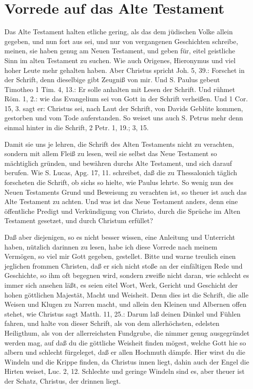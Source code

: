 
\chapter{Vorrede auf das Alte Testament}

Das Alte Testament halten etliche gering, als das dem jüdischen Volke allein gegeben, und nun fort aus sei, und nur von vergangenen Geschichten schreibe, meinen, sie haben genug am Neuen Testament, und geben für, eitel geistliche Sinn im alten Testament zu suchen. Wie auch Origenes, Hieronymus und viel hoher Leute mehr gehalten haben. Aber Christus spricht Joh. 5, 39.: Forschet in der Schrift, denn dieselbige gibt Zeugniß von mir. Und S. Paulus gebeut Timotheo 1 Tim. 4, 13.: Er solle anhalten mit Lesen der Schrift. Und rühmet Röm. 1, 2.: wie das Evangelium sei von Gott in der Schrift verheißen. Und 1 Cor. 15, 3. sagt er: Christus sei, nach Laut der Schrift, von Davids Geblüte kommen, gestorben und vom Tode auferstanden. So weiset uns auch S. Petrus mehr denn einmal hinter in die Schrift, 2 Petr. 1, 19.; 3, 15.

Damit sie uns je lehren, die Schrift des Alten Testaments nicht zu verachten, sondern mit allem Fleiß zu lesen, weil sie selbst das Neue Testament so mächtiglich gründen, und bewähren durchs Alte Testament, und sich darauf berufen. Wie S. Lucas, Apg. 17, 11. schreibet, daß die zu Thessalonich täglich forscheten die Schrift, ob sichs so hielte, wie Paulus lehrte. So wenig nun des Neuen Testaments Grund und Beweisung zu verachten ist, so theuer ist auch das Alte Testament zu achten. Und was ist das Neue Testament anders, denn eine öffentliche Predigt und Verkündigung von Christo, durch die Sprüche im Alten Testament gesetzet, und durch Christum erfüllet?

Daß aber diejenigen, so es nicht besser wissen, eine Anleitung und Unterricht haben, nützlich darinnen zu lesen, habe ich diese Vorrede nach meinem Vermögen, so viel mir Gott gegeben, gestellet. Bitte und warne treulich einen jeglichen frommen Christen, daß er sich nicht stoße an der einfältigen Rede und Geschichte, so ihm oft begegnen wird, sondern zweifle nicht daran, wie schlecht es immer sich ansehen läßt, es seien eitel Wort, Werk, Gericht und Geschicht der hohen göttlichen Majestät, Macht und Weisheit. Denn dies ist die Schrift, die alle Weisen und Klugen zu Narren macht, und allein den Kleinen und Albernen offen stehet, wie Christus sagt Matth. 11, 25.: Darum laß deinen Dünkel und Fühlen fahren, und halte von dieser Schrift, als von dem allerhöchsten, edelsten Heiligthum, als von der allerreichsten Fundgrube, die nimmer genug ausgegründet werden mag, auf daß du die göttliche Weisheit finden mögest, welche Gott hie so albern und schlecht fürgeleget, daß er allen Hochmuth dämpfe. Hier wirst du die Windeln und die Krippe finden, da Christus innen liegt, dahin auch der Engel die Hirten weiset, Luc. 2, 12. Schlechte und geringe Windeln sind es, aber theuer ist der Schatz, Christus, der drinnen liegt.

